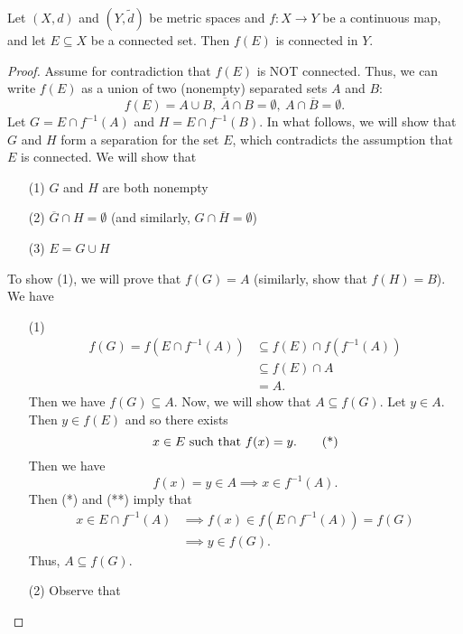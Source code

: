 \documentclass[a4paper]{article}
\begin{document}
\begin{theorem}
    Let \( (X,d) \) and \( (Y,\tilde{d}) \) be metric spaces and \( f: X \to Y  \) be a continuous map, and let \( E \subseteq X   \) be a connected set. Then \( f(E) \) is connected in \( Y  \).
\end{theorem}
\begin{proof}
Assume for contradiction that \( f(E) \) is NOT connected. Thus, we can write \( f(E) \) as a union of two (nonempty) separated sets \( A  \) and \( B  \):
\[  f(E) = A \cup B, \ \overline{A} \cap B = \emptyset, \ A \cap \overline{B} = \emptyset. \]
Let \( G = E \cap f^{-1}(A) \) and \( H = E \cap f^{-1}(B) \). In what follows, we will show that \( G  \) and \( H  \) form a separation for the set \( E  \), which contradicts the assumption that \( E  \) is connected. We will show that 
\begin{enumerate}
    \item[(1)] \( G  \) and \( H \) are both nonempty
    \item[(2)] \( \overline{G} \cap  H = \emptyset  \) (and similarly, \( G \cap \overline{H} = \emptyset \))
    \item[(3)] \( E = G \cup H  \)
\end{enumerate}
To show (1), we will prove that \( f(G) =A  \) (similarly, show that \( f(H)= B  \)). We have
\begin{enumerate}
    \item[(1)] 
        \begin{align*}
            f(G) = f(E \cap f^{-1}(A)) &\subseteq  f(E) \cap f(f^{-1}(A)) \\ 
                                       &\subseteq f(E) \cap A  \tag{\( f(E) = A \cup B \)}  \\
                                       &= A. 
    \end{align*}
    Then we have \( f(G) \subseteq  A  \). Now, we will show that \( A \subseteq f(G) \). Let \( y \in A  \). Then \( y \in f(E) \) and so there exists
    \[ \text{\( x \in E  \) such that \( f(x) =  y \).} \tag{*} \]
    Then we have 
    \[  f(x) = y \in A \implies x \in f^{-1}(A). \tag{**} \]
    Then (*) and (**) imply that 
    \begin{align*}
        x \in E \cap f^{-1}(A) &\implies f(x) \in f(E \cap f^{-1}(A)) = f(G) \\
                               &\implies y \in f(G). 
    \end{align*}
    Thus, \( A \subseteq  f(G) \).
    \item[(2)] Observe that

\end{enumerate}
\end{proof}
\end{document}
